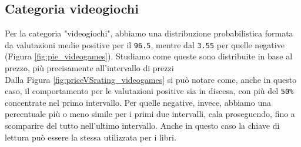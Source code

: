 		
			\subsection{Categoria videogiochi}
				Per la categoria "videogiochi", abbiamo una distribuzione probabilistica formata da valutazioni medie positive per il \verb|96.5|, mentre dal \verb|3.55| per quelle negative (Figura \ref{fig:pie_videogames}). Studiamo come queste sono distribuite in base al prezzo, più precisamente all'intervallo di prezzi\\
				Dalla Figura \ref{fig:priceVSrating_videogames} si può notare come, anche in questo caso, il comportamento per le valutazioni positive sia in discesa, con più del \verb|50%| concentrate nel primo intervallo. Per quelle negative, invece, abbiamo una percentuale più o meno simile per i primi due intervalli, cala proseguendo, fino a scomparire del tutto nell'ultimo intervallo. Anche in questo caso la chiave di lettura può essere la stessa utilizzata per i libri. 
			
